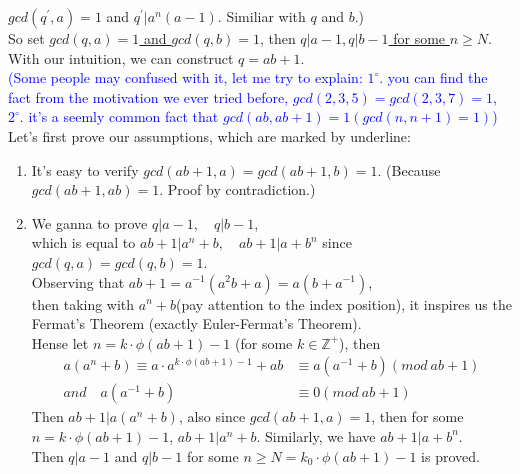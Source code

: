 \documentclass{Math_Note}
\begin{document}
\begin{sol}
{$gcd\left(q^{'},a\right)=1$ and $q^{'}\vert a^{n}\left(a-1\right)$. Similiar with $q$ and $b$.)\\
}
So set \underline{$gcd\left(q,a\right)=1$ and $gcd\left(q,b\right)=1$}, then \underline{$q\vert a-1, q\vert b-1$ for some $n\geq N$}.\\
With our intuition, we can construct $q=ab+1$. \\
\marginpar{\textcolor{green}{tip}}
\textcolor{blue}{
(Some people may confused with it, let me try to explain: 
$1^{\circ}.$ you can find the fact from the motivation we ever tried before, $gcd(2,3,5)=gcd(2,3,7)=1$, 
$2^{\circ}.$ it's a seemly common fact that $gcd\left(ab,ab+1\right)=1 \left(gcd\left(n,n+1\right)=1\right)$)\\
}
Let's first prove our assumptions, which are marked by underline: 
\begin{enumerate}
    \item It's easy to verify $gcd\left(ab+1,a\right)=gcd\left(ab+1,b\right)=1$. (Because $gcd\left(ab+1,ab\right)=1$. Proof by contradiction.)
    \item We ganna to prove $q\vert a-1,\quad q\vert b-1$, \\
    which is equal to $ab+1\vert a^{n}+b,\quad ab+1\vert a+b^{n}$ since $gcd\left(q,a\right)=gcd\left(q,b\right)=1$. \\
    Observing that $ab+1=a^{-1}\left(a^{2}b+a\right)=a\left(b+a^{-1}\right)$, \\
    then taking with $a^{n}+b$(pay attention to the index position), it inspires us the Fermat's Theorem (exactly Euler-Fermat's Theorem). \\
    Hense let $n=k\cdot\phi(ab+1)-1$ (for some $k\in\mathbb{Z}^{+}$), then 
    \begin{equation}
        \begin{split}
            a\left(a^{n}+b\right) \equiv a\cdot a^{k\cdot\phi(ab+1)-1}+ab &\equiv a\left(a^{-1}+b\right) \left(mod\ ab+1\right) \\
            and\quad a\left(a^{-1}+b\right) &\equiv 0 \left(mod\ ab+1\right)
        \end{split}
    \end{equation}
    Then $ab+1\vert a\left(a^{n}+b\right)$, also since $gcd\left(ab+1,a\right)=1$, then for some $n=k\cdot\phi(ab+1)-1$, $ab+1\vert a^{n}+b$. 
    Similarly, we have $ab+1\vert a+b^{n}$. \\
    Then $q\vert a-1$ and $q\vert b-1$ for some $n\geq N=k_{0}\cdot\phi(ab+1)-1$ is proved.
\end{enumerate}

\end{sol}
\end{document}
